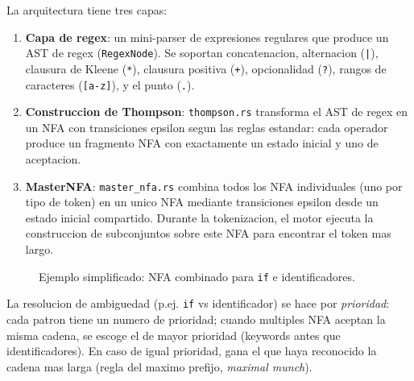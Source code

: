 \documentclass[12pt,a4paper]{article}
\begin{document}
La arquitectura tiene tres capas:

\begin{enumerate}
  \item \textbf{Capa de regex}: un mini-parser de expresiones regulares que produce un AST
    de regex (\texttt{RegexNode}). Se soportan concatenacion, alternacion (\texttt{|}),
    clausura de Kleene (\texttt{*}), clausura positiva (\texttt{+}), opcionalidad
    (\texttt{?}), rangos de caracteres (\texttt{[a-z]}), y el punto (\texttt{.}).
  \item \textbf{Construccion de Thompson}: \texttt{thompson.rs} transforma el AST de regex
    en un NFA con transiciones epsilon segun las reglas estandar: cada operador produce
    un fragmento NFA con exactamente un estado inicial y uno de aceptacion.
  \item \textbf{MasterNFA}: \texttt{master\_nfa.rs} combina todos los NFA individuales
    (uno por tipo de token) en un unico NFA mediante transiciones epsilon desde un estado
    inicial compartido. Durante la tokenizacion, el motor ejecuta la construccion de
    subconjuntos sobre este NFA para encontrar el token mas largo.
\end{enumerate}

\begin{figure}[H]
\centering
{}
\caption{Ejemplo simplificado: NFA combinado para \texttt{if} e identificadores.}
\end{figure}

La resolucion de ambiguedad (p.ej. \texttt{if} vs identificador) se hace por
\textit{prioridad}: cada patron tiene un numero de prioridad; cuando multiples NFA
aceptan la misma cadena, se escoge el de mayor prioridad (keywords antes que identificadores).
En caso de igual prioridad, gana el que haya reconocido la cadena mas larga (regla del
maximo prefijo, \textit{maximal munch}).
\end{document}
